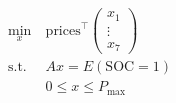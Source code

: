 \documentclass[preview]{standalone}
\begin{document}
\begin{align*}
\begin{aligned}\min_{x} &\ \text{prices}^\top \begin{pmatrix} x_1\\ \vdots\\ x_7 \end{pmatrix} \\\text{s.t.} &\ Ax = E\left(\text{SOC}=1\right) \\&\ 0 \leq x \leq P_\text{max} \end{aligned}
\end{align*}
\end{document}
